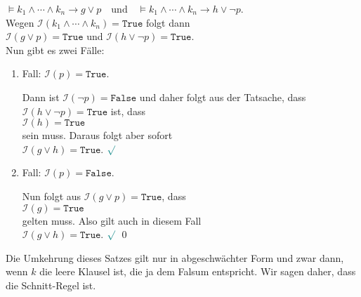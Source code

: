 \begin{enumerate}
      $\models k_1 \wedge \cdots \wedge k_n \rightarrow g \vee p \quad \mathrm{und} \quad 
         \models k_1 \wedge \cdots \wedge k_n \rightarrow h \vee \neg p
      $.
      \\[0.2cm]
      Wegen $\mathcal{I}(k_1 \wedge \cdots \wedge k_n) = \texttt{True}$ folgt dann
      \\[0.2cm]
      \hspace*{1.3cm}
      $\mathcal{I}(g \vee p) = \texttt{True}$ \quad und \quad $\mathcal{I}(h \vee \neg p) = \texttt{True}$.
      \\[0.2cm]
      Nun gibt es zwei Fälle:
      \begin{enumerate}
      \item Fall: $\mathcal{I}(p) = \texttt{True}$.

            Dann ist $\mathcal{I}(\neg p) = \texttt{False}$ und daher folgt aus der Tatsache, dass 
            $\mathcal{I}(h \vee \neg p) = \texttt{True}$ ist, dass
            \\[0.2cm]
            \hspace*{1.3cm}
            $\mathcal{I}(h) = \texttt{True}$
            \\[0.2cm]
            sein muss.  Daraus folgt aber sofort
            \\[0.2cm]
            \hspace*{1.3cm}
            $\mathcal{I}(g \vee h) = \texttt{True}$.  $\green{\surd}$
      \item Fall: $\mathcal{I}(p) = \texttt{False}$.

            Nun folgt aus $\mathcal{I}(g \vee p) = \texttt{True}$, dass
            \\[0.2cm]
            \hspace*{1.3cm}
            $\mathcal{I}(g) = \texttt{True}$
            \\[0.2cm]
            gelten muss.  Also gilt auch in diesem Fall
            \\[0.2cm]
            \hspace*{1.3cm}
            $\mathcal{I}(g \vee h) = \texttt{True}$.  $\green{\surd}$ 
            \qed
      \end{enumerate}
\end{enumerate}

\noindent
Die Umkehrung dieses Satzes gilt nur in abgeschwächter Form und zwar dann, wenn $k$
die leere Klausel ist, die ja dem Falsum entspricht.  Wir sagen daher, dass die Schnitt-Regel
 ist.

